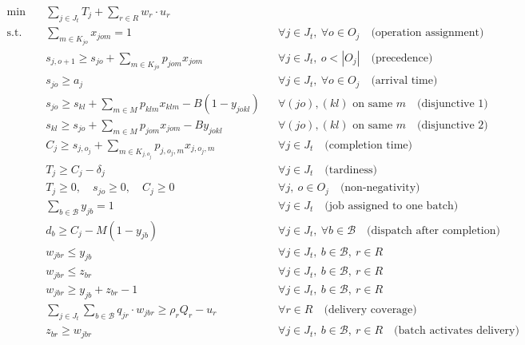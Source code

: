 \documentclass{article}
\begin{document}
\begin{align}
\min \quad & \sum_{j \in J_t} T_j + \sum_{r \in R} w_r \cdot u_r \\[4pt]
\text{s.t.} \quad
& \sum_{m \in K_{jo}} x_{jom} = 1 && \forall j \in J_t,\ \forall o \in O_j \quad \text{(operation assignment)} \\[4pt]
& s_{j,o+1} \geq s_{jo} + \sum_{m \in K_{jo}} p_{jom} x_{jom} && \forall j \in J_t,\ o < |O_j| \quad \text{(precedence)} \\[4pt]
& s_{jo} \geq a_j && \forall j \in J_t,\ \forall o \in O_j \quad \text{(arrival time)} \\[4pt]
& s_{jo} \geq s_{kl} + \sum_{m \in M} p_{klm} x_{klm} - B (1 - y_{jokl}) && \forall (jo), (kl) \text{ on same } m \quad \text{(disjunctive 1)} \\[4pt]
& s_{kl} \geq s_{jo} + \sum_{m \in M} p_{jom} x_{jom} - B y_{jokl} && \forall (jo), (kl) \text{ on same } m \quad \text{(disjunctive 2)} \\[4pt]
& C_j \geq s_{j,o_j} + \sum_{m \in K_{j,o_j}} p_{j,o_j,m} x_{j,o_j,m} && \forall j \in J_t \quad \text{(completion time)} \\[4pt]
& T_j \geq C_j - \delta_j && \forall j \in J_t \quad \text{(tardiness)} \\[4pt]
& T_j \geq 0,\quad s_{jo} \geq 0,\quad C_j \geq 0 && \forall j,\ o \in O_j \quad \text{(non-negativity)} \\[4pt]
%
& \sum_{b \in \mathcal{B}} y_{jb} = 1 && \forall j \in J_t \quad \text{(job assigned to one batch)} \\[4pt]
& d_b \geq C_j - M(1 - y_{jb}) && \forall j \in J_t,\ \forall b \in \mathcal{B} \quad \text{(dispatch after completion)} \\[4pt]
%
& w_{jbr} \leq y_{jb} && \forall j \in J_t,\ b \in \mathcal{B},\ r \in R \label{con:w1} \\[2pt]
& w_{jbr} \leq z_{br} && \forall j \in J_t,\ b \in \mathcal{B},\ r \in R \label{con:w2} \\[2pt]
& w_{jbr} \geq y_{jb} + z_{br} - 1 && \forall j \in J_t,\ b \in \mathcal{B},\ r \in R \label{con:w3} \\[4pt]
& \sum_{j \in J_t} \sum_{b \in \mathcal{B}} q_{jr} \cdot w_{jbr} \geq \rho_r Q_r - u_r && \forall r \in R \quad \text{(delivery coverage)} \\[4pt]
& z_{br} \geq w_{jbr} && \forall j \in J_t,\ b \in \mathcal{B},\ r \in R \quad \text{(batch activates delivery)} 
\end{align}
\end{document}
